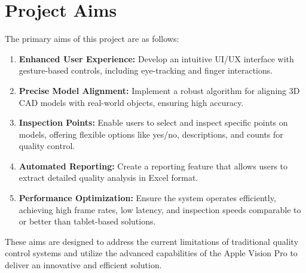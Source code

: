 

\section{Project Aims}

The primary aims of this project are as follows:
\begin{enumerate}
    \item \textbf{Enhanced User Experience:} Develop an intuitive UI/UX interface with gesture-based controls, including eye-tracking and finger interactions.
    \item \textbf{Precise Model Alignment:} Implement a robust algorithm for aligning 3D CAD models with real-world objects, ensuring high accuracy.
    \item \textbf{Inspection Points:} Enable users to select and inspect specific points on models, offering flexible options like yes/no, descriptions, and counts for quality control.
    \item \textbf{Automated Reporting:} Create a reporting feature that allows users to extract detailed quality analysis in Excel format.
    \item \textbf{Performance Optimization:} Ensure the system operates efficiently, achieving high frame rates, low latency, and inspection speeds comparable to or better than tablet-based solutions.
\end{enumerate}

These aims are designed to address the current limitations of traditional quality control systems and utilize the advanced capabilities of the Apple Vision Pro to deliver an innovative and efficient solution.

